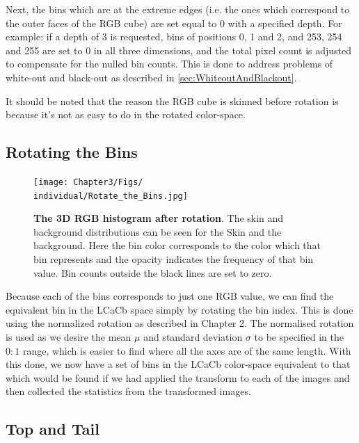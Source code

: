 Next, the bins which are at the extreme edges (i.e. the ones which correspond to the outer faces of the RGB cube) are set equal to 0 with a specified depth. For example: if a depth of 3 is requested, bins of positions 0, 1 and 2, and 253, 254 and 255 are set to 0 in all three dimensions, and the total pixel count is adjusted to compensate for the nulled bin counts. This is done to address problems of white-out and black-out as described in \ref{sec:WhiteoutAndBlackout}.



It should be noted that the reason the RGB cube is skinned before rotation is because it's not as easy to do in the rotated color-space.


\subsection{Rotating the Bins}\label{sec:RotatingTheBins}

\begin{figure}[h!] %
  \centering
    \texttt{[image: Chapter3/Figs/\\individual/Rotate\_the\_Bins.jpg]}
        \caption{\textbf{The 3D RGB histogram after rotation}. The skin and background distributions can be seen for the Skin and the background. Here the bin color corresponds to the color which that bin represents and the opacity indicates the frequency of that bin value. Bin counts outside the black lines are set to zero. }   \label{fig:Rotate_the_Bins}
\end{figure}

Because each of the bins corresponds to just one RGB value, we can find the equivalent bin in the LCaCb space simply by rotating the bin index. This is done using the normalized rotation as described in Chapter 2. The normalised rotation is used as we desire the mean $\mu$ and standard deviation $\sigma$ to be specified in the $0:1$ range, which is easier to find where all the axes are of the same length. With this done, we now have a set of bins in the LCaCb color-space equivalent to that which would be found if we had applied the transform to each of the images and then collected the statistics from the transformed images.





\subsection{Top and Tail}\label{sec:TopAndTail}

